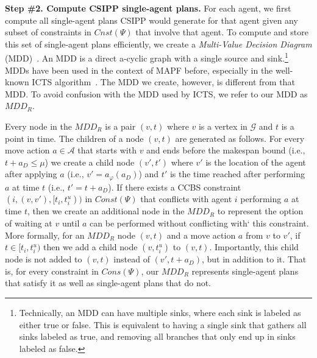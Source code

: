 \documentclass[review]{elsarticle}
\newcommand{\mddr}{\ensuremath{MDD_R}\xspace}
\newcommand\konstantin[1]{\nb{\textbf{Konstantin:}}{red}{#1}}
\newcommand{\ccbs}{\ac{CCBS}\xspace}
\newcommand{\csipp}{\ac{CSIPP}\xspace}
\newcommand{\mapf}{\ac{MAPF}\xspace}
\begin{document}
\noindent \textbf{Step \#2. Compute \csipp single-agent plans.}
For each agent, we first compute all single-agent plans \csipp would generate for that agent given any subset of constraints in $Cnst(\Psi)$ that involve that agent. To compute and store this set of single-agent plans efficiently, we create a 
\emph{Multi-Value Decision Diagram} (MDD)~\cite{srinivasan1990algorithms}. 
An MDD is a direct a-cyclic graph with a single source and sink.\footnote{Technically, an MDD can have multiple sinks, where each sink is labeled as either true or false. This is equivalent to having a single sink that gathers all sinks labeled as true, and removing all branches that only end up in sinks labeled as false.}
MDDs have been used in the context of \mapf before, especially in the well-known ICTS algorithm~\cite{sharon2013increasing}. 
The MDD we create, however, is different from that MDD. 
To avoid confusion with the MDD used by ICTS, we refer to our MDD as \mddr. 



Every node in the \mddr is a pair $(v,t)$ where $v$ is a vertex in $\mathcal{G}$ and $t$ is a point in time. 
The children of a node $(v,t)$ are generated as follows. 
For every move action $a\in \mathcal{A}$ %
that starts with $v$ and ends before the makespan bound (i.e., $t+a_D\leq \mu$)
we create a child node $(v',t')$ where 
$v'$ is the location of the agent after applying $a$ (i.e., $v'=a_\varphi(a_D)$) and 
$t'$ is the time reached after performing $a$ at time $t$ (i.e., $t'=t+a_D$). 
If there exists a \ccbs constraint $(i, (v,v'), [t_i, t_i^u))$ in $Const(\Psi)$ 
that conflicts with agent $i$ performing $a$ at time $t$, 
then we create an additional node in the \mddr to represent the option of waiting at $v$ until $a$ can be performed without conflicting with` this constraint. 
More formally, for an \mddr node $(v,t)$ 
and a move action $a$ from $v$ to $v'$, 
if $t\in [t_i, t_i^u)$ then we add a child node $(v,t_i^u)$ to $(v,t)$. 
Importantly, this child node is not added to $(v,t)$ instead of $(v', t+a_D)$, but in addition to it. 
That is, for every constraint in $Cons(\Psi)$, our \mddr represents single-agent plans that satisfy it
as well as single-agent plans that do not. 
\end{document}
